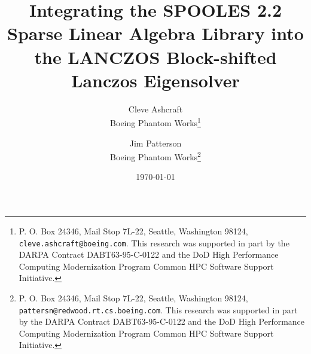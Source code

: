 \documentclass[10pt]{report}
\begin{document}
 


\title{Integrating the {\bf SPOOLES} 2.2 Sparse Linear Algebra Library 
       \break 
       into the {\bf LANCZOS} Block-shifted Lanczos Eigensolver }
 
\author{
Cleve Ashcraft\\
Boeing Phantom Works\thanks{
  P. O. Box 24346,
  Mail Stop 7L-22,
  Seattle, Washington 98124,
  {\tt cleve.ashcraft@boeing.com}.
  This research was supported in part by the DARPA
  Contract DABT63-95-C-0122 and the DoD High Performance Computing
  Modernization Program Common HPC Software Support Initiative.}
\and
Jim Patterson\\
Boeing Phantom Works\thanks{
  P. O. Box 24346,
  Mail Stop 7L-22,
  Seattle, Washington 98124,
  {\tt pattersn@redwood.rt.cs.boeing.com}.
  This research was supported in part by the DARPA
  Contract DABT63-95-C-0122 and the DoD High Performance Computing
  Modernization Program Common HPC Software Support Initiative.}
}
 
\date{\today}
\maketitle
 
\tableofcontents

  
  
  
  

\appendix
  
  
  


\end{document}
